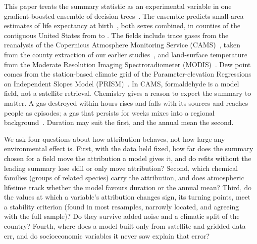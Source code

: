 \documentclass[sensors,article,submit,moreauthors,pdftex]{Definitions/mdpi}
\begin{document}
This paper treats the summary statistic as an experimental variable in one
gradient-boosted ensemble of decision trees~\cite{Friedman2001}. The ensemble predicts small-area estimates of life expectancy at birth~\cite{DwyerLindgren2022}, both sexes combined, in
counties of the contiguous United States from \YearStart{} to \YearEnd{}. The
fields include trace gases from the reanalysis of the Copernicus Atmosphere Monitoring Service
(CAMS)~\cite{Inness2019}, taken from the county extraction of our
earlier studies~\cite{Ruwali2026multi, Shrestha2026exp}, and land-surface temperature
from the Moderate Resolution Imaging Spectroradiometer
(MODIS)~\cite{Wan2014}. Dew
point comes from the station-based climate grid of the Parameter-elevation Regressions on Independent Slopes
Model (PRISM)~\cite{Daly2008, Daly2015}. In CAMS, formaldehyde is a model
field, not a satellite retrieval. Chemistry gives
a reason to expect the summary to matter. A gas destroyed within hours rises
and falls with its sources and reaches people as episodes; a gas that persists
for weeks mixes into a regional background~\cite{Seinfeld2016}. Duration may
suit the first, and the annual mean the second.

We ask four questions about how attribution behaves, not how large any
environmental effect is. First, with the data held fixed, how far does the
summary chosen for a field move the attribution a model gives it, and do
refits without the leading summary lose skill or only move attribution?
Second, which chemical families (groups of related species) carry the
attribution, and does atmospheric lifetime track whether the model favours
duration or the annual mean? Third, do the values at which a
variable's attribution changes sign, its turning points, meet a stability
criterion (found in most resamples, narrowly
located, and agreeing with the full sample)? Do they survive added noise and a climatic split of
the country? Fourth, where does a model built only
from satellite and gridded data err, and do socioeconomic variables it never saw
explain that error?
\end{document}
